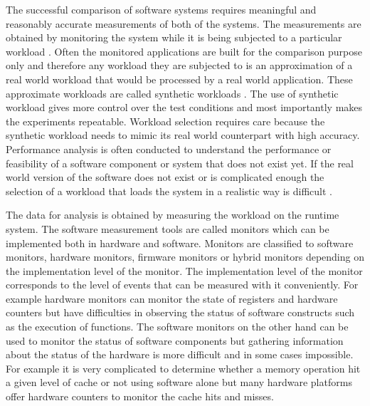 The successful comparison of software systems requires meaningful and reasonably
accurate measurements of both of the systems. The measurements are obtained by
monitoring the system while it is being subjected to a particular workload
\cite{jain1991art}. Often the monitored applications are built for the comparison
purpose only and therefore any workload they are subjected to is an
approximation of a real world workload that would be processed by a real world
application. These approximate workloads are called synthetic workloads
\cite{jain1991art}. The use of synthetic workload gives more control over the
test conditions and most importantly makes the experiments repeatable. Workload
selection requires care because the synthetic workload needs to mimic its real
world counterpart with high accuracy. Performance analysis is often conducted to
understand the performance or feasibility of a software component or system that
does not exist yet. If the real world version of the software does not exist or
is complicated enough the selection of a workload that loads the system in a
realistic way is difficult \cite{jain1991art}.

The data for analysis is obtained by measuring the workload on the runtime
system. The software measurement tools are called monitors which can be
implemented both in hardware and software. Monitors are classified to software
monitors, hardware monitors, firmware monitors or hybrid monitors depending on
the implementation level of the monitor. The implementation level of the monitor
corresponds to the level of events that can be measured with it conveniently.
For example hardware monitors can monitor the state of registers and hardware
counters but have difficulties in observing the status of software constructs
such as the execution of functions. The software monitors on the other hand can
be used to monitor the status of software components but gathering information
about the status of the hardware is more difficult and in some cases impossible.
\cite{jain1991art} For example it is very complicated to determine whether a
memory operation hit a given level of cache or not using software alone but many
hardware platforms offer hardware counters to monitor the cache hits and misses.

